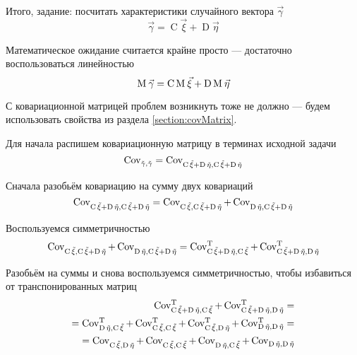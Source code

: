 Итого, задание: посчитать характеристики случайного вектора $\vec{\gamma}$
$$\vec{\gamma} = \operatorname{C} \vec{\xi} + \operatorname{D} \vec{\eta}$$

Математическое ожидание считается крайне просто --- достаточно воспользоваться
линейностью
$$\mean{\vec{\gamma}}
  = \operatorname{C} \mean{\vec{\xi}} + \operatorname{D} \mean{\vec{\eta}}$$

С ковариационной матрицей проблем возникнуть тоже не должно --- будем
использовать свойства из раздела \ref{section:covMatrix}.

Для начала распишем ковариационную матрицу в терминах исходной задачи
$$\dCov{\vec{\gamma}}
  = \dCov{\operatorname{C} \vec{\xi} + \operatorname{D} \vec{\eta}}$$

Сначала разобьём ковариацию на сумму двух ковариаций
$$
\dCov{\operatorname{C} \vec{\xi} + \operatorname{D} \vec{\eta}}
= \Cov{\operatorname{C} \vec{\xi}}{
      \operatorname{C} \vec{\xi} + \operatorname{D} \vec{\eta}}
  + \Cov{\operatorname{D} \vec{\eta}}{
      \operatorname{C} \vec{\xi} + \operatorname{D} \vec{\eta}}
$$

Воспользуемся симметричностью
$$
\Cov{\operatorname{C} \vec{\xi}}{
      \operatorname{C} \vec{\xi} + \operatorname{D} \vec{\eta}}
  + \Cov{\operatorname{D} \vec{\eta}}{
      \operatorname{C} \vec{\xi} + \operatorname{D} \vec{\eta}}
= \Cov[T]{\operatorname{C} \vec{\xi} + \operatorname{D} \vec{\eta}}{
      \operatorname{C} \vec{\xi}}
  + \Cov[T]{\operatorname{C} \vec{\xi} + \operatorname{D} \vec{\eta}}{
      \operatorname{D} \vec{\eta}}
$$

Разобьём на суммы и снова воспользуемся симметричностью, чтобы избавиться
от транспонированных матриц
\begin{align*}
\Cov[T]{\operatorname{C} \vec{\xi} + \operatorname{D} \vec{\eta}}{
      \operatorname{C} \vec{\xi}}
  + \Cov[T]{\operatorname{C} \vec{\xi} + \operatorname{D} \vec{\eta}}{
      \operatorname{D} \vec{\eta}} = \\
= \Cov[T]{\operatorname{D} \vec{\eta}}{\operatorname{C} \vec{\xi}}
  + \Cov[T]{\operatorname{C} \vec{\xi}}{\operatorname{C} \vec{\xi}}
  + \Cov[T]{\operatorname{C} \vec{\xi}}{\operatorname{D} \vec{\eta}}
  + \Cov[T]{\operatorname{D} \vec{\eta}}{\operatorname{D} \vec{\eta}} = \\
= \Cov{\operatorname{C} \vec{\xi}}{\operatorname{D} \vec{\eta}}
  + \Cov{\operatorname{C} \vec{\xi}}{\operatorname{C} \vec{\xi}}
  + \Cov{\operatorname{D} \vec{\eta}}{\operatorname{C} \vec{\xi}}
  + \Cov{\operatorname{D} \vec{\eta}}{\operatorname{D} \vec{\eta}}
\end{align*}

